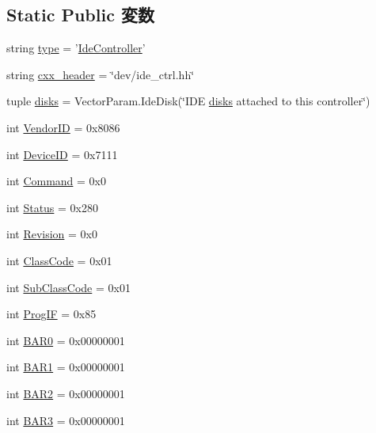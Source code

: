 \subsection*{Static Public 変数}
\begin{DoxyCompactItemize}
\item 
string \hyperlink{classIde_1_1IdeController_acce15679d830831b0bbe8ebc2a60b2ca}{type} = '\hyperlink{classIde_1_1IdeController}{IdeController}'
\item 
string \hyperlink{classIde_1_1IdeController_a17da7064bc5c518791f0c891eff05fda}{cxx\_\-header} = \char`\"{}dev/ide\_\-ctrl.hh\char`\"{}
\item 
tuple \hyperlink{classIde_1_1IdeController_a2c7f0e8eb92ef4c0dd95f088a33fd142}{disks} = VectorParam.IdeDisk(\char`\"{}IDE \hyperlink{classIde_1_1IdeController_a2c7f0e8eb92ef4c0dd95f088a33fd142}{disks} attached to this controller\char`\"{})
\item 
int \hyperlink{classIde_1_1IdeController_a96ec1b4422f12f72160a0633ada47217}{VendorID} = 0x8086
\item 
int \hyperlink{classIde_1_1IdeController_a4a8ed9a0233fc6d0ce178569c4de25d0}{DeviceID} = 0x7111
\item 
int \hyperlink{classIde_1_1IdeController_a36c5506122899541315d168541f135f6}{Command} = 0x0
\item 
int \hyperlink{classIde_1_1IdeController_ae58c2415cf1178457fa1254234c3f017}{Status} = 0x280
\item 
int \hyperlink{classIde_1_1IdeController_a1c872d7167f0869b85418babe0ca6ced}{Revision} = 0x0
\item 
int \hyperlink{classIde_1_1IdeController_a7d0125d1930fad943a6a7471da0317ad}{ClassCode} = 0x01
\item 
int \hyperlink{classIde_1_1IdeController_a6537e94b8ab06acd357673ec1699adc8}{SubClassCode} = 0x01
\item 
int \hyperlink{classIde_1_1IdeController_aa63e82532e33e89795f472cfb7e0bb67}{ProgIF} = 0x85
\item 
int \hyperlink{classIde_1_1IdeController_aa4b1656989a2151c14fc1d464df6531c}{BAR0} = 0x00000001
\item 
int \hyperlink{classIde_1_1IdeController_a0d644194139bee13ebf45d34542c1dfa}{BAR1} = 0x00000001
\item 
int \hyperlink{classIde_1_1IdeController_a0a6f9c88531fa1221329ec6903976a8b}{BAR2} = 0x00000001
\item 
int \hyperlink{classIde_1_1IdeController_a0b8b6594cd17a42ee6f2bded401213d9}{BAR3} = 0x00000001

\end{DoxyCompactItemize}
